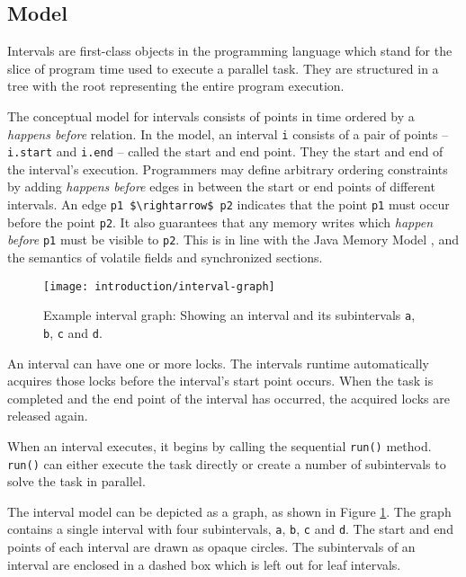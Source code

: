 \subsection{Model}
\label{sec:intro-intervals-model}

Intervals are first-class objects in the programming language which
stand for the slice of program time used to execute a parallel task.
They are structured in a tree with the root representing the entire
program execution.

The conceptual model for intervals consists of points in time ordered
by a \emph{happens before} relation. In the model, an interval
\lstinline!i! consists of a pair of points -- \lstinline!i.start! and
\lstinline!i.end! -- called the start and end point. They the start
and end of the interval's execution. Programmers may define arbitrary
ordering constraints by adding \emph{happens before} edges in between
the start or end points of different intervals. An edge
\lstinline!p1 $\rightarrow$ p2! indicates that the point
\lstinline!p1! must occur before the point \lstinline!p2!. It also
guarantees that any memory writes which \emph{happen before}
\lstinline!p1! must be visible to \lstinline!p2!. This is in line with
the Java Memory Model \cite{Manson2005}, and the semantics of volatile
fields and synchronized sections.

\begin{figure}[htb]
  \centering
  \texttt{[image: introduction/interval-graph]}
  \caption[Example interval graph]{Example interval graph: Showing an
    interval and its subintervals \lstinline!a!, \lstinline!b!,
    \lstinline!c! and \lstinline!d!.}
  \label{fig:introduction-interval-graph}
\end{figure}

An interval can have one or more locks. The intervals runtime
automatically acquires those locks before the interval's start point
occurs. When the task is completed and the end point of the interval
has occurred, the acquired locks are released again.

When an interval executes, it begins by calling the sequential
\lstinline!run()! method. \lstinline!run()! can either execute the
task directly or create a number of subintervals to solve the task in
parallel.

The interval model can be depicted as a graph, as shown in Figure
\ref{fig:introduction-interval-graph}. The graph contains a single
interval with four subintervals, \lstinline!a!, \lstinline!b!,
\lstinline!c! and \lstinline!d!. The start and end points of each
interval are drawn as opaque circles. The subintervals of an interval
are enclosed in a dashed box which is left out for leaf intervals.


